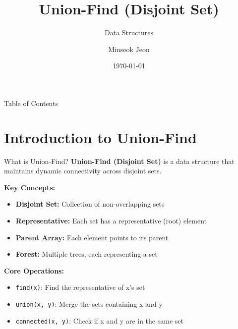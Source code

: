 \documentclass[aspectratio=169]{beamer}
\title{Union-Find (Disjoint Set)}
\subtitle{Data Structures}
\author{Minseok Jeon}
\institute{DGIST}
\date{\today}
\begin{document}
\begin{frame}
  \titlepage
\end{frame}

\begin{frame}{Table of Contents}
  \tableofcontents
\end{frame}

\section{Introduction to Union-Find}

\begin{frame}{What is Union-Find?}
  \textbf{Union-Find (Disjoint Set)} is a data structure that maintains dynamic connectivity across disjoint sets.

  \vspace{0.5cm}
  \textbf{Key Concepts:}
  \begin{itemize}
    \item \textbf{Disjoint Set:} Collection of non-overlapping sets
    \item \textbf{Representative:} Each set has a representative (root) element
    \item \textbf{Parent Array:} Each element points to its parent
    \item \textbf{Forest:} Multiple trees, each representing a set
  \end{itemize}

  \vspace{0.5cm}
  \textbf{Core Operations:}
  \begin{itemize}
    \item \texttt{find(x)}: Find the representative of x's set
    \item \texttt{union(x, y)}: Merge the sets containing x and y
    \item \texttt{connected(x, y)}: Check if x and y are in the same set
  \end{itemize}
\end{frame}
\end{document}

